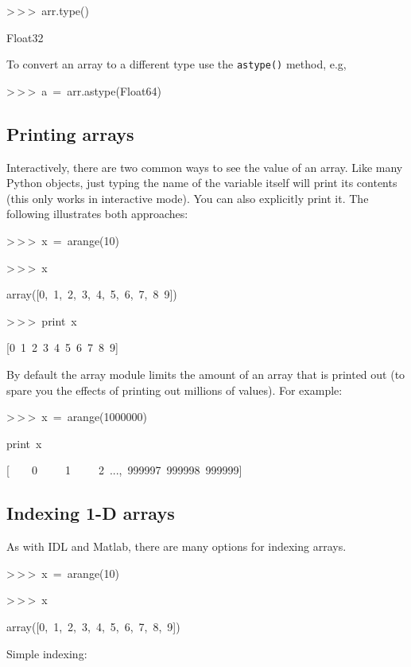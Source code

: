 \begin{lyxcode}
>\,{}>\,{}>~arr.type()

Float32
\end{lyxcode}
To convert an array to a different type use the \texttt{astype()}
method, e.g,

\begin{lyxcode}
>\,{}>\,{}>~a~=~arr.astype(Float64)
\end{lyxcode}

\subsection{Printing arrays}

Interactively, there are two common ways to see the value of an array.
Like many Python objects, just typing the name of the variable itself
will print its contents (this only works in interactive mode). You
can also explicitly print it. The following illustrates both approaches:

\begin{lyxcode}
>\,{}>\,{}>~x~=~arange(10)

>\,{}>\,{}>~x

array({[}0,~1,~2,~3,~4,~5,~6,~7,~8~9])

>\,{}>\,{}>~print~x

{[}0~1~2~3~4~5~6~7~8~9]
\end{lyxcode}
By default the array module limits the amount of an array that is
printed out (to spare you the effects of printing out millions of
values). For example:

\begin{lyxcode}
>\,{}>\,{}>~x~=~arange(1000000)

print~x

{[}~~~~0~~~~~1~~~~~2~...,~999997~999998~999999]
\end{lyxcode}

\subsection{Indexing 1-D arrays}

As with IDL and Matlab, there are many options for indexing arrays.

\begin{lyxcode}
>\,{}>\,{}>~x~=~arange(10)

>\,{}>\,{}>~x

array({[}0,~1,~2,~3,~4,~5,~6,~7,~8,~9])
\end{lyxcode}
Simple indexing:

